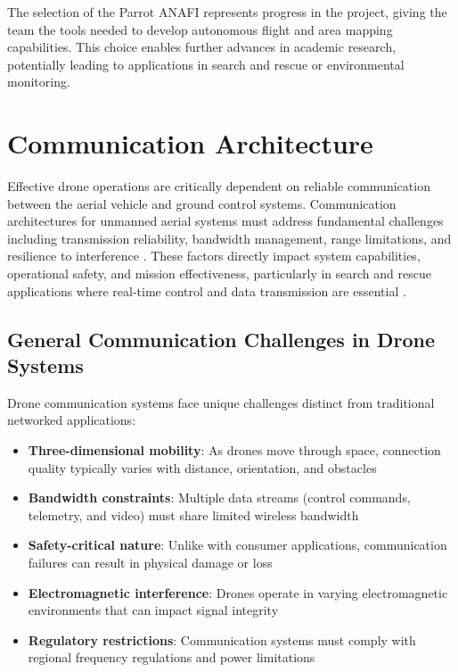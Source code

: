 The selection of the Parrot ANAFI represents progress in the project, giving the team the tools needed to develop autonomous flight and area mapping capabilities. This choice enables further advances in academic research, potentially leading to applications in search and rescue or environmental monitoring.

\section{Communication Architecture}
Effective drone operations are critically dependent on reliable communication between the aerial vehicle and ground control systems. Communication architectures for unmanned aerial systems must address fundamental challenges including transmission reliability, bandwidth management, range limitations, and resilience to interference \cite{Sharma2017}. These factors directly impact system capabilities, operational safety, and mission effectiveness, particularly in search and rescue applications where real-time control and data transmission are essential \cite{Erdelj2017}.

\subsection{General Communication Challenges in Drone Systems}

Drone communication systems face unique challenges distinct from traditional networked applications:

\begin{itemize}
    \item \textbf{Three-dimensional mobility}: As drones move through space, connection quality typically varies with distance, orientation, and obstacles \cite{Zeng2016}
    \item \textbf{Bandwidth constraints}: Multiple data streams (control commands, telemetry, and video) must share limited wireless bandwidth \cite{Hayat2016}
    \item \textbf{Safety-critical nature}: Unlike with consumer applications, communication failures can result in physical damage or loss \cite{Koubaa2019}
    \item \textbf{Electromagnetic interference}: Drones operate in varying electromagnetic environments that can impact signal integrity \cite{Fotouhi2019}
    \item \textbf{Regulatory restrictions}: Communication systems must comply with regional frequency regulations and power limitations \cite{Gupta2016}
\end{itemize}

